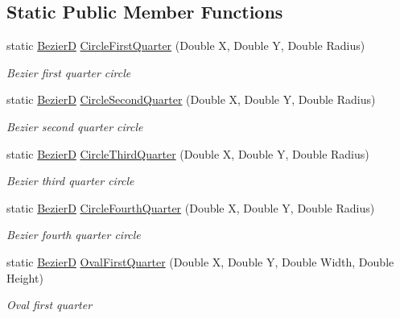 \subsection*{Static Public Member Functions}
\begin{DoxyCompactItemize}
\item 
static \hyperlink{class_pdf_file_writer_1_1_bezier_d}{BezierD} \hyperlink{class_pdf_file_writer_1_1_bezier_d_a35e7040a4eb6894ebc2c2216ef7d8892}{Circle\+First\+Quarter} (Double X, Double Y, Double Radius)
\begin{DoxyCompactList}\small\item\em Bezier first quarter circle \end{DoxyCompactList}\item 
static \hyperlink{class_pdf_file_writer_1_1_bezier_d}{BezierD} \hyperlink{class_pdf_file_writer_1_1_bezier_d_a796e636226b7ca96f9fdcd770ea22384}{Circle\+Second\+Quarter} (Double X, Double Y, Double Radius)
\begin{DoxyCompactList}\small\item\em Bezier second quarter circle \end{DoxyCompactList}\item 
static \hyperlink{class_pdf_file_writer_1_1_bezier_d}{BezierD} \hyperlink{class_pdf_file_writer_1_1_bezier_d_a9ff6bc894d6fcf4c3f169c7c4351620e}{Circle\+Third\+Quarter} (Double X, Double Y, Double Radius)
\begin{DoxyCompactList}\small\item\em Bezier third quarter circle \end{DoxyCompactList}\item 
static \hyperlink{class_pdf_file_writer_1_1_bezier_d}{BezierD} \hyperlink{class_pdf_file_writer_1_1_bezier_d_ac5102520bd9c0ce9423305985ebe470f}{Circle\+Fourth\+Quarter} (Double X, Double Y, Double Radius)
\begin{DoxyCompactList}\small\item\em Bezier fourth quarter circle \end{DoxyCompactList}\item 
static \hyperlink{class_pdf_file_writer_1_1_bezier_d}{BezierD} \hyperlink{class_pdf_file_writer_1_1_bezier_d_a1451e31d8c296e1599acf0676795d45a}{Oval\+First\+Quarter} (Double X, Double Y, Double Width, Double Height)
\begin{DoxyCompactList}\small\item\em Oval first quarter \end{DoxyCompactList}\item 

\end{DoxyCompactItemize}
